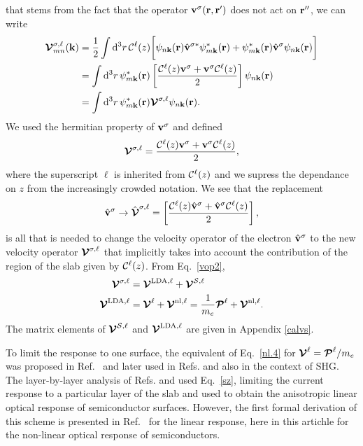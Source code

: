 \documentclass[floatfix,prb,aps,superscriptaddress,11pt,preprint,letterpaper]{revtex4}
\begin{document}
that stems from the fact that the operator $\mathbf{v}^\sigma(\mathbf{r},\mathbf{r}')$ does not act on
$\mathbf{r}''$, we can write
\begin{align}\label{nl.3}
\boldsymbol{\mathcal{\cal V}}^{\sigma,\ell}_{mn}({\mathbf k})
&=
\frac{1}{2}
\int \mathrm{d}^3 r\,
 {\mathbf{\cal C}}^\ell(z)
 \bigg[
\psi_{n\mathbf{k}}(\mathbf{r})
\hat{\mathbf{v}}^{\sigma *}\psi^*_{m\mathbf{k}}(\mathbf{r})
+ 
\psi^*_{m\mathbf{k}}(\mathbf{r})\hat{\mathbf{v}}^\sigma
\psi_{n\mathbf{k}}(\mathbf{r})
\bigg]
\nonumber\\
&=
\int \mathrm{d}^3 r\,
\psi^*_{m\mathbf{k}}(\mathbf{r})
\left[\frac{{\mathbf{\cal C}}^\ell(z) \mathbf{v}^\sigma +
\mathbf{v}^\sigma {\mathbf{\cal C}}^\ell(z)}{2}\right]
\psi_{n\mathbf{k}}(\mathbf{r})
\nonumber\\
&=
\int \mathrm{d}^3 r\,
\psi^*_{m\mathbf{k}}(\mathbf{r})
\boldsymbol{\mathcal{\cal V}}^{\sigma,\ell}
\psi_{n\mathbf{k}}(\mathbf{r})
.
\end{align}
We used the hermitian property of $\mathbf{v}^\sigma$ and defined
\begin{align}\label{nl.4}
\boldsymbol{\mathcal{\cal V}}^{\sigma,\ell}
=
\frac{{\mathbf{\cal C}}^\ell(z) \mathbf{v}^\sigma +
\mathbf{v}^\sigma {\mathbf{\cal C}}^\ell(z)}{2}
,
\end{align} 
where the superscript $\ell$ is inherited from ${\mathbf{\cal C}}^\ell(z)$ and we
supress the dependance on $z$ from the increasingly crowded notation.  
We see that the replacement
\begin{align}\label{vcali}
\hat{\mathbf{v}}^\sigma \to \hat{\boldsymbol{\mathcal{\cal V}}}^{\sigma,\ell}=\left[\frac{{\mathbf{\cal C}}^\ell(z) \hat{\mathbf{v}}^\sigma +
\hat{\mathbf{v}}^\sigma {\mathbf{\cal C}}^\ell(z)}{2}\right]
,
\end{align} 
is all that is needed to change the
velocity operator of the electron $\hat{\mathbf{v}}^\sigma$ to the new velocity
operator $\boldsymbol{\mathcal{\cal V}}^{\sigma,\ell}$ that implicitly takes into account the
contribution of the region of the slab given by ${\mathbf{\cal C}}^\ell(z)$.
From Eq.~\eqref{vop2},
\begin{align}\label{vopii}
\boldsymbol{\mathcal{\cal V}}^{\sigma,\ell}
&=
\boldsymbol{\mathcal{\cal V}}^{\mathrm{LDA},\ell}
+
\boldsymbol{\mathcal{\cal V}}^{{\cal S},\ell}
\nonumber\\
\boldsymbol{\mathcal{\cal V}}^{\mathrm{LDA},\ell}
&=
\boldsymbol{\mathcal{\cal V}}^{\ell}
+
\boldsymbol{\mathcal{\cal V}}^{\mathrm{nl},\ell}
=
\frac{1}{m_e}
\boldsymbol{\mathcal{\cal P}}^{\ell}
+
\boldsymbol{\mathcal{\cal V}}^{\mathrm{nl},\ell}
.
\end{align}
The matrix elements of $\boldsymbol{\mathcal{\cal V}}^{{\cal S},\ell}$ and $\boldsymbol{\mathcal{\cal V}}^{\mathrm{LDA},\ell}$
are given in 
Appendix \ref{calvs}.

To limit the response to one surface, the equivalent of Eq.~\eqref{nl.4} 
for $\boldsymbol{\mathcal{\cal V}}^\ell=\boldsymbol{\mathcal{\cal P}}^\ell/m_e$ was proposed in 
Ref.~ and later used in Refs.
 and  
also in the context of SHG. 
The layer-by-layer analysis of Refs.  
and  used Eq.~\eqref{sz}, 
limiting the current response
to a particular layer of the slab and used to obtain the
anisotropic linear optical response of semiconductor surfaces.
However, the first formal derivation of this scheme is presented in
Ref.~ for the linear response, here in this 
artichle for the non-linear optical response of semiconductors.
\end{document}
